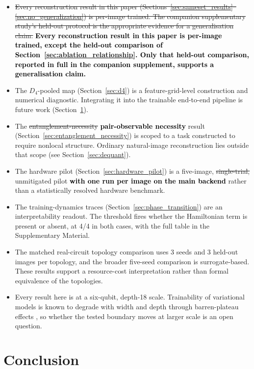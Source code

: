 \documentclass[pdflatex,sn-basic]{sn-jnl}
\newcommand{\del}[1]{\sout{#1}}
\newcommand{\add}[1]{\textbf{\textcolor{black}{#1}}}
\begin{document}
\begin{itemize}\itemsep4pt
\item \del{Every reconstruction result in this paper (Sections~\ref{sec:sameset_results}--\ref{sec:no_generalization}) is per-image trained. The companion supplementary study's held-out protocol is the appropriate evidence for a generalisation claim.} \add{Every reconstruction result in this paper is per-image trained, except the held-out comparison of Section~\ref{sec:ablation_relationship}. Only that held-out comparison, reported in full in the companion supplement, supports a generalisation claim.}
\item The $D_4$-pooled map (Section~\ref{sec:d4}) is a feature-grid-level construction and numerical diagnostic. Integrating it into the trainable end-to-end pipeline is future work (Section~\ref{sec:conclusion}).
\item The \del{entanglement-necessity} \add{pair-observable necessity} result (Section~\ref{sec:entanglement_necessity}) is scoped to a task constructed to require nonlocal structure. Ordinary natural-image reconstruction lies outside that scope (see Section~\ref{sec:dequant}).
\item The hardware pilot (Section~\ref{sec:hardware_pilot}) is a five-image, \del{single-trial,} unmitigated pilot \add{with one run per image on the main backend} rather than a statistically resolved hardware benchmark.
\item The training-dynamics traces (Section~\ref{sec:phase_transition}) are an interpretability readout. The threshold fires whether the Hamiltonian term is present or absent, at 4/4 in both cases, with the full table in the Supplementary Material.
\item The matched real-circuit topology comparison uses 3 seeds and 3 held-out images per topology, and the broader five-seed comparison is surrogate-based. These results support a resource-cost interpretation rather than formal equivalence of the topologies.
\item Every result here is at a six-qubit, depth-18 scale. Trainability of variational models is known to degrade with width and depth through barren-plateau effects \citep{McClean2018, Larocca2025}, so whether the tested boundary moves at larger scale is an open question.
\end{itemize}

\section{Conclusion}
\label{sec:conclusion}
\end{document}
